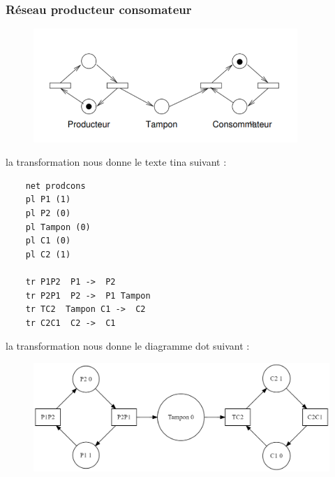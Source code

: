 \documentclass{article}
\begin{document}
\subsubsection{Réseau producteur consomateur}
\begin{figure}[H]
    \centering
    \includegraphics[width = 10cm]{net-prodcons.png}
\end{figure}
la transformation nous donne le texte tina suivant :
\begin{verbatim}
    net prodcons
    pl P1 (1)
    pl P2 (0)
    pl Tampon (0)
    pl C1 (0)
    pl C2 (1)
    
    tr P1P2  P1 ->  P2
    tr P2P1  P2 ->  P1 Tampon
    tr TC2  Tampon C1 ->  C2
    tr C2C1  C2 ->  C1
\end{verbatim}
la transformation nous donne le diagramme dot suivant :
\begin{figure}[H]
    \centering
    \includegraphics[width = 15cm]{dot-prodcons.png}
\end{figure}
\end{document}
